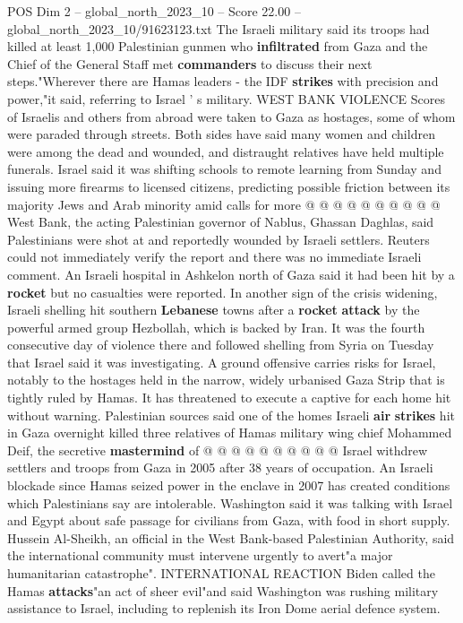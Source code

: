 \begin{textsample}{POS Dim 2 – global\_north\_2023\_10 – Score 22.00 – global\_north\_2023\_10/91623123.txt}
The Israeli military said its troops had killed at least 1,000 Palestinian gunmen who \textbf{infiltrated} from Gaza and the Chief of the General Staff met \textbf{commanders} to discuss their next steps."Wherever there are Hamas leaders - the IDF \textbf{strikes} with precision and power,"it said, referring to Israel ' s military.
WEST BANK VIOLENCE Scores of Israelis and others from abroad were taken to Gaza as hostages, some of whom were paraded through streets.
Both sides have said many women and children were among the dead and wounded, and distraught relatives have held multiple funerals.
Israel said it was shifting schools to remote learning from Sunday and issuing more firearms to licensed citizens, predicting possible friction between its majority Jews and Arab minority amid calls for more @ @ @ @ @ @ @ @ @ @ West Bank, the acting Palestinian governor of Nablus, Ghassan Daghlas, said Palestinians were shot at and reportedly wounded by Israeli settlers.
Reuters could not immediately verify the report and there was no immediate Israeli comment.
An Israeli hospital in Ashkelon north of Gaza said it had been hit by a \textbf{rocket} but no casualties were reported.
In another sign of the crisis widening, Israeli shelling hit southern \textbf{Lebanese} towns after a \textbf{rocket} \textbf{attack} by the powerful armed group Hezbollah, which is backed by Iran.
It was the fourth consecutive day of violence there and followed shelling from Syria on Tuesday that Israel said it was investigating.
A ground offensive carries risks for Israel, notably to the hostages held in the narrow, widely urbanised Gaza Strip that is tightly ruled by Hamas.
It has threatened to execute a captive for each home hit without warning.
Palestinian sources said one of the homes Israeli \textbf{air} \textbf{strikes} hit in Gaza overnight killed three relatives of Hamas military wing chief Mohammed Deif, the secretive \textbf{mastermind} of @ @ @ @ @ @ @ @ @ @ Israel withdrew settlers and troops from Gaza in 2005 after 38 years of occupation.
An Israeli blockade since Hamas seized power in the enclave in 2007 has created conditions which Palestinians say are intolerable.
Washington said it was talking with Israel and Egypt about safe passage for civilians from Gaza, with food in short supply.
Hussein Al-Sheikh, an official in the West Bank-based Palestinian Authority, said the international community must intervene urgently to avert"a major humanitarian catastrophe".
INTERNATIONAL REACTION Biden called the Hamas \textbf{attacks}"an act of sheer evil"and said Washington was rushing military assistance to Israel, including to replenish its Iron Dome aerial defence system.

\end{textsample}
